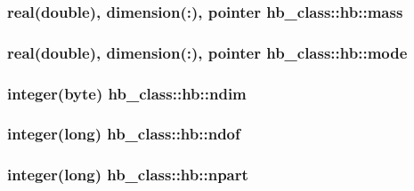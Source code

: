 \hypertarget{structhb__class_1_1hb_a245f6fbd55fe85b3c5c7dfda8e9aeadc}{
\subsubsection[{mass}]{\setlength{\rightskip}{0pt plus 5cm}real(double), dimension(\+:), pointer hb\+\_\+class\+::hb\+::mass\hspace{0.3cm}{\ttfamily [private]}}}\label{structhb__class_1_1hb_a245f6fbd55fe85b3c5c7dfda8e9aeadc}
\hypertarget{structhb__class_1_1hb_ac5b121a046f5ee32acc9830d4a9d0583}{
\subsubsection[{mode}]{\setlength{\rightskip}{0pt plus 5cm}real(double), dimension(\+:), pointer hb\+\_\+class\+::hb\+::mode\hspace{0.3cm}{\ttfamily [private]}}}\label{structhb__class_1_1hb_ac5b121a046f5ee32acc9830d4a9d0583}
\hypertarget{structhb__class_1_1hb_ab4c00922e761160b8ec3e3e3bcf41217}{
\subsubsection[{ndim}]{\setlength{\rightskip}{0pt plus 5cm}integer(byte) hb\+\_\+class\+::hb\+::ndim\hspace{0.3cm}{\ttfamily [private]}}}\label{structhb__class_1_1hb_ab4c00922e761160b8ec3e3e3bcf41217}
\hypertarget{structhb__class_1_1hb_a0984c9d5bd990546d1b4b5f804ab3238}{
\subsubsection[{ndof}]{\setlength{\rightskip}{0pt plus 5cm}integer(long) hb\+\_\+class\+::hb\+::ndof\hspace{0.3cm}{\ttfamily [private]}}}\label{structhb__class_1_1hb_a0984c9d5bd990546d1b4b5f804ab3238}
\hypertarget{structhb__class_1_1hb_aa1ccd4393febf95c0c9b30f3e8b23bc3}{
\subsubsection[{npart}]{\setlength{\rightskip}{0pt plus 5cm}integer(long) hb\+\_\+class\+::hb\+::npart\hspace{0.3cm}{\ttfamily [private]}}}\label{structhb__class_1_1hb_aa1ccd4393febf95c0c9b30f3e8b23bc3}
